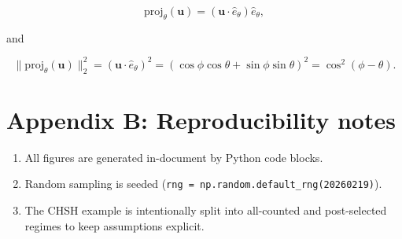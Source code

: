 \documentclass[
  letterpaper,
  DIV=11,
  numbers=noendperiod]{scrartcl}
\providecommand{\tightlist}{%
  \setlength{\itemsep}{0pt}\setlength{\parskip}{0pt}}
\begin{document}
\[
\mathrm{proj}_{\theta}(\mathbf u)=(\mathbf u\cdot\hat e_\theta)\hat e_\theta,
\]

and

\[
\|\mathrm{proj}_{\theta}(\mathbf u)\|_2^2=(\mathbf u\cdot\hat e_\theta)^2
=(\cos\phi\cos\theta+\sin\phi\sin\theta)^2
=\cos^2(\phi-\theta).
\]

\section{Appendix B: Reproducibility
notes}\label{appendix-b-reproducibility-notes}

\begin{enumerate}
\def\labelenumi{\arabic{enumi}.}
\tightlist
\item
  All figures are generated in-document by Python code blocks.
\item
  Random sampling is seeded
  (\texttt{rng\ =\ np.random.default\_rng(20260219)}).
\item
  The CHSH example is intentionally split into all-counted and
  post-selected regimes to keep assumptions explicit.
\end{enumerate}
\end{document}
